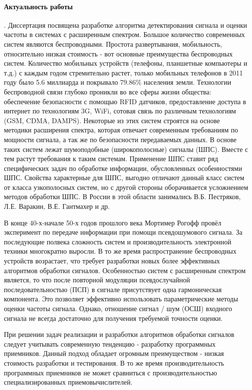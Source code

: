 \paragraph{Актуальность работы}. Диссертация посвящена разработке алгоритма детектирования сигнала и оценки частоты
в системах с расширенным спектром.
Большое количество современных систем являются беспроводными. Простота развертывания, мобильность, относительно низкая
стоимость - вот основные преимущества беспроводных систем. Количество мобильных устройств (телефоны, планшетные компьютеры
и т.д.) с каждым годом стремительно растет, только мобильных телефонов в 2011 году было 5.6 миллиарда и покрывало 79.86\%
 населения земли. Технологии беспроводной связи глубоко проникли во все сферы жизни общества:
обеспечение безопасности с помощью RFID датчиков, предоставление доступа в интернет по технологиям 3G, WiFi, 
сотовая связь по различным технологиям (GSM, CDMA, DAMPS). Некоторые из этих систем строятся на основе методики
расширения спектра, которая отвечает современным требованиям по мощности сигнала, а так же по безопасности передаваемых
данных. В основе таких систем лежат шумоподобные (широкополосные) сигналы (ШПС). Вместе с тем растут требования к таким
системам. Применение ШПС ставит ряд специфических задач по обработке информации, обусловленных особенностями ШПС.
Свойства характерные для ШПС, выгодно отличают данный класс систем от класса узкополосных систем, но с другой стороны
оборачивается усложнением методов обработки ШПС. В России в этой области занимались В.Б. Пестряков, Л.Е. Варакин, В.Е. Гантмахер и др.

В конце 40-х-начале 50-х годов прошлого века Мортимер Рогофф провёл эксперимент по передаче информации при помощи
псевдошумового сигнала. За последующие полвека сложность систем и производительность электронной техники многократно
выросли. В то же время распространение беспроводных устройств возрастает, что требует разработки новых более
эффективных алгоритмов обработки сигналов. Особенностью систем с расширенным спектром является, то что после повторной
модуляции псевдослучайной последовательностью (ПСП) в сигнале присутствует одна гармоническая компонента.
Это позволяет эффективно использовать параметрические методы
оценки частоты сигнала. Однако, отношение сигнал / шум (ОСШ) входного сигнала не всегда достаточно для получения требуемой точности оценки.

При решении задач реализации и разработки алгоритмов обработки сигналов следует учитывать современную тенденцию - разработку
программных приемников. Данный подход обладает огромным преимуществом - низкая стоимость разработки и тестирования. В то же
время производительность программных приемников не может сравниться с производительностью специализированных приемовычислителей.

